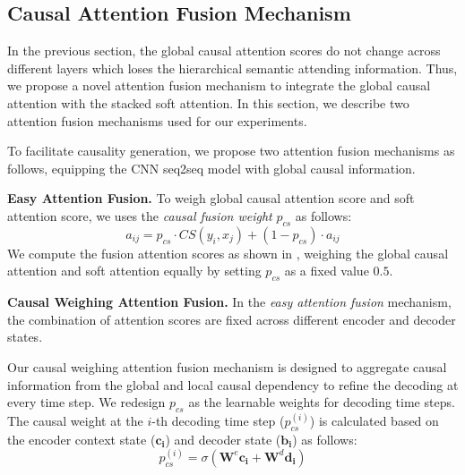 \subsection{Causal Attention Fusion Mechanism}
\label{sec:fusion}
In the previous section, the global causal attention scores do not change across different layers which loses the hierarchical semantic attending information.
Thus, we propose a novel attention fusion mechanism 
to integrate the global causal attention with the stacked soft attention. In this section, we describe two attention fusion mechanisms used for our experiments.

To facilitate causality generation, 
we propose two attention fusion mechanisms as follows,
equipping the CNN seq2seq model with global causal information.

\textbf{Easy Attention Fusion.}
To weigh global causal attention score and soft attention score, we uses the \emph{causal fusion weight} $p_{cs}$  as follows:
\begin{equation}
\label{eq:easy}
a_{ij} = p_{cs} \cdot CS(y_i,x_j) + (1-p_{cs}) \cdot a_{ij}
\end{equation}
We compute the fusion attention scores as shown in , weighing the global causal attention and soft attention equally by setting $p_{cs}$ as a fixed value $0.5$. 

\textbf{Causal Weighing Attention Fusion.} 
In the \emph{easy attention fusion} mechanism, the combination of attention scores are fixed across different encoder and decoder states.

Our causal weighing attention fusion mechanism is designed to aggregate causal information from the global and local causal dependency to refine the decoding at every time step. 
We redesign $p_{cs}$ as the learnable weights for decoding time steps. 
The causal weight at the $i$-th decoding time step ($p^{(i)}_{cs}$) is calculated based on the encoder context state ($\mathbf{c_i}$) and decoder state ($\mathbf{b_i}$) as follows:
\begin{equation}
p^{(i)}_{cs} = \sigma(\mathbf{W}^e\mathbf{c_i} + \mathbf{W}^d\mathbf{d_i}) 
\end{equation}

